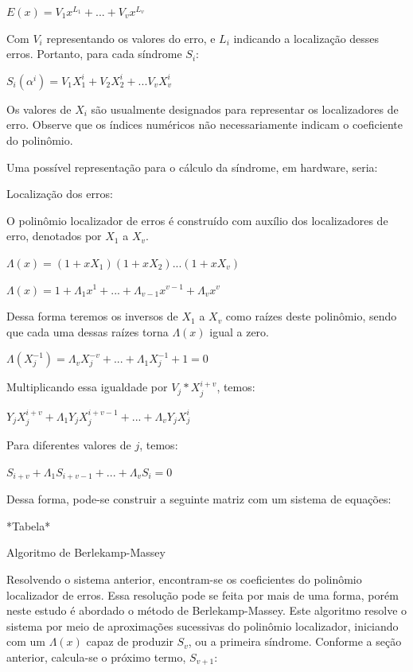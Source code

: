 	$E(x) = V_{1}x^{L_{1}} + ... + V_{v}x^{L_{v}}$
	
	
	Com $V_{i}$ representando os valores do erro, e $L_{i}$ indicando a localização desses erros. Portanto, para cada síndrome $S_{i}$:
	
	$S_{i}(\alpha^{i}) = V_{1}X_{1}^{i} + V_{2}X_{2}^{i} + ... V_{v}X_{v}^{i}$
	
	
	Os valores de $X_{i}$ são usualmente designados para representar os localizadores de erro. Observe que os índices numéricos não necessariamente indicam o coeficiente do polinômio.
	
	Uma possível representação para o cálculo da síndrome, em hardware, seria:
	
	Localização dos erros:
	
	O polinômio localizador de erros é construído com auxílio dos localizadores de erro, denotados por $X_{1}$ a $X_{v}$.
	
	
	$\Lambda(x) = (1 + xX_{1})(1 + xX_{2})...(1 + xX_{v})$
	
	$\Lambda(x) =  1 + \Lambda_{1}x^{1} + ... + \Lambda_{v-1}x^{v-1} + \Lambda_{v}x^{v}$
	
	
	Dessa forma teremos os inversos de $X_{1}$ a $X_{v}$ como raízes deste polinômio, sendo que cada uma dessas raízes torna $\Lambda(x)$ igual a zero. 
	
	$\Lambda(X_{j}^{-1}) = \Lambda_{v}X_{j}^{-v} + ... + \Lambda_{1}X_{j}^{-1} + 1 = 0$
	
	
	Multiplicando essa igualdade por $V_{j}*X_{j}^{i+v}$, temos:
	
	$Y_{j}X_{j}^{i+v} + \Lambda_{1}Y_{j}X_{j}^{i+v-1} + ... + \Lambda_{v}Y_{j}X_{j}^{i}$
	
	
	Para diferentes valores de $j$, temos:
	
	$S_{i+v} + \Lambda_{1}S_{i+v-1} + ... + \Lambda_{v}S_{i} = 0$
	
	
	Dessa forma, pode-se construir a seguinte matriz com um sistema de equações:
	
	*Tabela*
	
	Algoritmo de Berlekamp-Massey
	
	Resolvendo o sistema anterior, encontram-se os coeficientes do polinômio localizador de erros. Essa resolução pode se feita por mais de uma forma, porém neste estudo é abordado o método de Berlekamp-Massey. Este algoritmo resolve o sistema por meio de aproximações sucessivas do polinômio localizador, iniciando com um $\Lambda(x)$ capaz de produzir $S_{v}$, ou a primeira síndrome. Conforme a seção anterior, calcula-se o próximo termo, $S_{v + 1}$:
	
